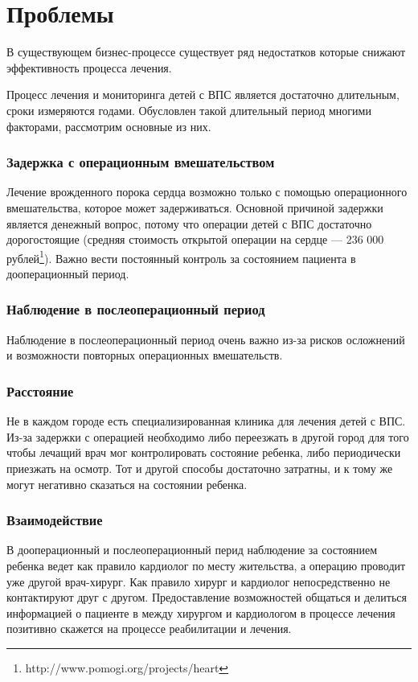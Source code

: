\newpage
\chapter{Проблемы}
В существующем бизнес-процессе существует ряд недостатков которые снижают
эффективность процесса лечения.

Процесс лечения и мониторинга детей с ВПС является достаточно длительным, сроки
измеряются годами. Обусловлен такой длительный период многими факторами,
рассмотрим основные из них.

\subsection{Задержка с операционным вмешательством}
Лечение врожденного порока сердца возможно только с помощью операционного
вмешательства, которое может задерживаться. Основной причиной задержки является
денежный вопрос, потому что операции детей с ВПС достаточно дорогостоящие
(средняя стоимость открытой операции на сердце — 236 000 рублей\footnote{
http://www.pomogi.org/projects/heart }).
Важно вести постоянный контроль за состоянием пациента в дооперационный период.

\subsection{Наблюдение в послеоперационный период}
Наблюдение в послеоперационный период очень важно из-за рисков осложнений и
возможности повторных операционных вмешательств.

\subsection{Расстояние}
Не в каждом городе есть специализированная клиника для лечения детей с ВПС.
Из-за задержки с операцией необходимо либо переезжать в другой город для того
чтобы лечащий врач мог контролировать состояние ребенка, либо периодически
приезжать на осмотр. Тот и другой способы достаточно затратны, и к тому же могут
негативно сказаться на состоянии ребенка.

\subsection{Взаимодействие}
В дооперационный и послеоперационный перид наблюдение за состоянием ребенка
ведет как правило кардиолог по месту жительства, а операцию проводит уже другой
врач-хирург. Как правило хирург и кардиолог непосредственно не контактируют друг
с другом. Предоставление возможностей общаться и делиться информацией о пациенте
в между хирургом и кардиологом в процессе лечения позитивно скажется на процессе
реабилитации и лечения.

